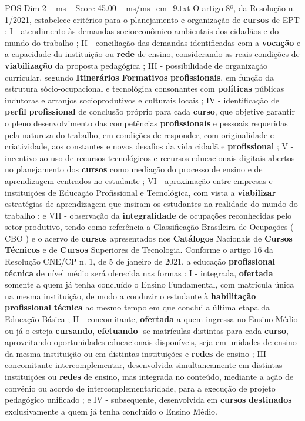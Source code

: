\begin{textsample}{POS Dim 2 – ms – Score 45.00 – ms/ms\_em\_9.txt}
O artigo 8º, da Resolução n. 1/2021, estabelece critérios para o planejamento e organização de \textbf{cursos} de EPT : I - atendimento às demandas socioeconômico ambientais dos cidadãos e do mundo do trabalho ; II - conciliação das demandas identificadas com a \textbf{vocação} e a capacidade da instituição ou \textbf{rede} de ensino, considerando as reais condições de \textbf{viabilização} da proposta pedagógica ; III - possibilidade de organização curricular, segundo \textbf{Itinerários} \textbf{Formativos} \textbf{profissionais}, em função da estrutura sócio-ocupacional e tecnológica consonantes com \textbf{políticas} públicas indutoras e arranjos socioprodutivos e culturais locais ; IV - identificação de \textbf{perfil} \textbf{profissional} de conclusão próprio para cada \textbf{curso}, que objetive garantir o pleno desenvolvimento das competências \textbf{profissionais} e pessoais requeridas pela natureza do trabalho, em condições de responder, com originalidade e criatividade, aos constantes e novos desafios da vida cidadã e \textbf{profissional} ; V - incentivo ao uso de recursos tecnológicos e recursos educacionais digitais abertos no planejamento dos \textbf{cursos} como mediação do processo de ensino e de aprendizagem centrados no estudante ; VI - aproximação entre empresas e instituições de Educação Profissional e Tecnológica, com vista a \textbf{viabilizar} estratégias de aprendizagem que insiram os estudantes na realidade do mundo do trabalho ; e VII - observação da \textbf{integralidade} de ocupações reconhecidas pelo setor produtivo, tendo como referência a Classificação Brasileira de Ocupações ( CBO ) e o acervo de \textbf{cursos} apresentados nos \textbf{Catálogos} Nacionais de \textbf{Cursos} \textbf{Técnicos} e de \textbf{Cursos} Superiores de Tecnologia.
Conforme o artigo 16 da Resolução CNE/CP n. 1, de 5 de janeiro de 2021, a educação \textbf{profissional} \textbf{técnica} de nível médio será oferecida nas formas : I - integrada, \textbf{ofertada} somente a quem já tenha concluído o Ensino Fundamental, com matrícula única na mesma instituição, de modo a conduzir o estudante à \textbf{habilitação} \textbf{profissional} \textbf{técnica} ao mesmo tempo em que conclui a última etapa da Educação Básica ; II - concomitante, \textbf{ofertada} a quem ingressa no Ensino Médio ou já o esteja \textbf{cursando}, \textbf{efetuando} -se matrículas distintas para cada \textbf{curso}, aproveitando oportunidades educacionais disponíveis, seja em unidades de ensino da mesma instituição ou em distintas instituições e \textbf{redes} de ensino ; III - concomitante intercomplementar, desenvolvida simultaneamente em distintas instituições ou \textbf{redes} de ensino, mas integrada no conteúdo, mediante a ação de convênio ou acordo de intercomplementaridade, para a execução de projeto pedagógico unificado ; e IV - subsequente, desenvolvida em \textbf{cursos} \textbf{destinados} exclusivamente a quem já tenha concluído o Ensino Médio.

\end{textsample}
